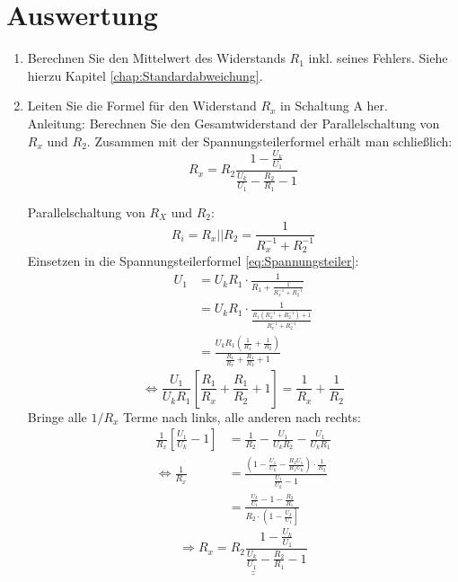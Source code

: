 \section{Auswertung} 
\begin{enumerate}
 \item Berechnen Sie den Mittelwert des Widerstands $R_1$ inkl. seines Fehlers. Siehe hierzu Kapitel \ref{chap:Standardabweichung}.
 \item Leiten Sie die Formel für den Widerstand $R_x$ in Schaltung A her.\\
  Anleitung: Berechnen Sie den Gesamtwiderstand der Parallelschaltung von $R_x$ und $R_2$. Zusammen mit der Spannungsteilerformel erhält man schließlich:
  \begin{equation}
   R_x = R_2 \frac{1-\frac{U_k}{U_1}}{\frac{U_k}{U_1}-\frac{R_2}{R_1}-1}
  \end{equation}
	\begin{solution}
		Parallelschaltung von $R_X$ und $R_2$: 
		\begin{equation*}
			R_i = R_x||R_2 = \frac{1}{R_x^{-1} + R_2^{-1}}
		\end{equation*}
		Einsetzen in die Spannungsteilerformel \ref{eq:Spannungsteiler}:
		\begin{align*}
			U_1 & = U_k R_1\cdot\frac{1}{R_1 + \frac{1}{R_x^{-1} + R_2^{-1}}}\\
					& = U_k R_1\cdot\frac{1}{\frac{R_1\left(R_x^{-1}+R_2^{-1}\right)+1}{R_x^{-1}+R_2^{-1}}}\\
					& = \frac{U_k R_1\left(\frac{1}{R_x}+\frac{1}{R_2}\right)}{\frac{R_1}{R_x}+\frac{R_1}{R_2}+1}
		\end{align*}
		\[
			\Leftrightarrow \frac{U_1}{U_k R_1}\left[\frac{R_1}{R_x}+\frac{R_1}{R_2}+1\right] = \frac{1}{R_x}+\frac{1}{R_2} 
		\]
		Bringe alle $1/R_x$ Terme nach links, alle anderen nach rechts:
		\begin{align*}
			\frac{1}{R_x}\left[\frac{U_1}{U_k}-1\right] & = \frac{1}{R_2}-\frac{U_1}{U_k R_2}-\frac{U_1}{U_k R_1}\\
			\Leftrightarrow \frac{1}{R_x} & = \frac{\left(1-\frac{U_1}{U_k}-\frac{R_2 U_1}{R_1 U_k}\right)\cdot\frac{1}{R_2}}{\frac{U_1}{U_k}-1}\\
																		& = \frac{\frac{U_k}{U_1}-1-\frac{R_2}{R_1}}{R_2\cdot\left(1-\frac{U_k}{U_1}\right]}
		\end{align*}
		\begin{equation}\label{eq:RX}
			\Rightarrow	\underline{\underline{R_x = R_2\frac{1-\frac{U_k}{U_1}}{\frac{U_k}{U_1}-\frac{R_2}{R_1}-1}}}

\end{equation}
\end{solution}
\end{enumerate}
